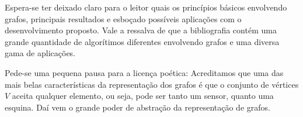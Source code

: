 \documentclass[a4paper,12pt]{article}
\begin{document}
Espera-se ter deixado claro para o leitor quais os princípios básicos envolvendo grafos, principais resultados e esboçado possíveis aplicações com o desenvolvimento proposto. Vale a ressalva de que a bibliografia contém uma grande quantidade de algorítimos diferentes envolvendo grafos e uma diversa gama de aplicações. 

Pede-se uma pequena pausa para a licença poética: Acreditamos que uma das mais belas características da representação dos grafos é que o conjunto de vértices $V$ aceita qualquer elemento, ou seja, pode ser tanto um sensor, quanto uma esquina. Daí vem o grande poder de abstração da representação de grafos.

{}



\end{document}
